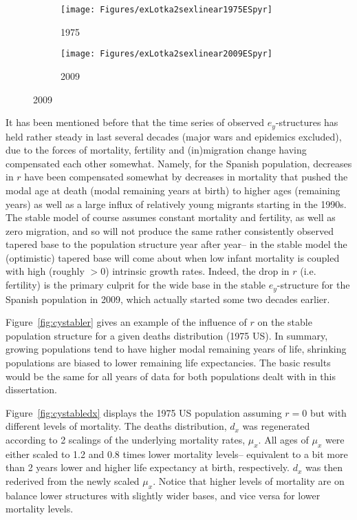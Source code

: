\begin{figure}[!ht]
        \centering
        \caption{Spain, stable ($\sigma = 0.05$) versus initial
        $e_y$-structures, 1975 and 2009}
        \label{fig:stablevsinitES}
        \begin{subfigure}
                \centering
                \caption*{1975}
                \texttt{[image: Figures/exLotka2sexlinear1975ESpyr]}
        \end{subfigure}
        \begin{subfigure}
                \centering
                \caption*{2009}
                \texttt{[image: Figures/exLotka2sexlinear2009ESpyr]}
        \end{subfigure}
         
\end{figure}
\FloatBarrier
It has been mentioned before that the time series of observed $e_y$-structures
has held rather steady in last several decades (major wars and epidemics excluded),
due to the forces of mortality, fertility and (in)migration change having
compensated each other somewhat. Namely, for the Spanish population, decreases
in $r$ have been compensated somewhat by decreases in mortality that pushed the modal age at
death (modal remaining years at birth) to higher ages (remaining years) as well
as a large influx of relatively young migrants starting in the 1990s. The stable
model of course assumes constant mortality and fertility, as well as zero
migration, and so will not produce the same rather consistently observed tapered
base to the population structure year after year-- in the stable model the
(optimistic) tapered base will come about when low infant mortality is coupled
with high (roughly $>0$) intrinsic growth rates. Indeed, the drop in $r$ (i.e.
fertility) is the primary culprit for the wide base in the stable
$e_y$-structure for the Spanish population in 2009, which actually started some
two decades earlier. 

Figure~\ref{fig:cystabler} gives an example of the
influence of $r$ on the stable population structure for a given deaths
distribution (1975 US). In summary, growing populations tend to have higher
modal remaining years of life, shrinking populations are biased to lower
remaining life expectancies. The basic results would be the same for all years
of data for both populations dealt with in this dissertation.

Figure~\ref{fig:cystabledx} displays the 1975 US population assuming $r=0$ but
with different levels of mortality. The deaths distribution, $d_x$ was
regenerated according to 2 scalings of the underlying mortality rates, $\mu_x$.
All ages of $\mu_x$ were either scaled to 1.2 and 0.8 times lower mortality
levels-- equivalent to a bit more than 2 years lower and higher life expectancy 
at birth, respectively. $d_x$ was then rederived from the
newly scaled $\mu_x$. Notice that higher levels of mortality are on balance
lower structures with slightly wider bases, and vice versa for lower mortality
levels. 

